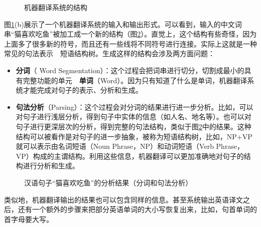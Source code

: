 \begin{figure}[htp]
    \centering
 	\subfigure[\small{机器翻译系统 = 前/后处理 + 核心引擎}] {}
	\caption{机器翻译系统的结构}
    \label{fig:3.1-1}
\end{figure}

\parinterval 图\ref{fig:3.1-1}(b)展示了一个机器翻译系统的输入和输出形式。可以看到，输入的中文词串“猫喜欢吃鱼”被加工成一个新的结构（图\ref{fig:3.1-2}）。直觉上，这个结构有些奇怪，因为上面多了很多新的符号，而且还有一些线将不同符号进行连接。实际上这就是一种常见的句法表示\ \dash \ 短语结构树。生成这样的结构会涉及两方面问题：

\begin{itemize}
\vspace{0.5em}
\item {\small\sffamily\bfseries{分词}}（ Word Segmentation）：这个过程会把词串进行切分，切割成最小的具有完整功能的单元\ \dash\ {\small\sffamily\bfseries{单词}}（Word）。因为只有知道了什么是单词，机器翻译系统才能完成对句子的表示、分析和生成。
\vspace{0.5em}
\item {\small\sffamily\bfseries{句法分析}}（Parsing）：这个过程会对分词的结果进行进一步分析。比如，可以对句子进行浅层分析，得到句子中实体的信息（如人名、地名等）。也可以对句子进行更深层次的分析，得到完整的句法结构，类似于图\ref{fig:3.1-2}中的结果。这种结构可以被看作是对句子的进一步抽象，被称为短语结构树，比如，NP+VP就可以表示由名词短语（Noun Phrase，NP）和动词短语（Verb Phrase，VP）构成的主谓结构。利用这些信息，机器翻译可以更加准确地对句子的结构进行分析和生成。
\vspace{0.5em}
\end{itemize}

\begin{figure}[htp]
\centering

\caption{汉语句子“猫喜欢吃鱼”的分析结果（分词和句法分析）}
\label{fig:3.1-2}
\end{figure}

\parinterval 类似地，机器翻译输出的结果也可以包含同样的信息。甚至系统输出英语译文之后，还有一个额外的步骤来把部分英语单词的大小写恢复出来，比如，句首单词的首字母要大写。

